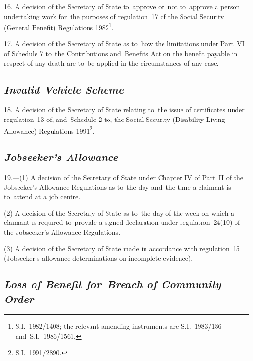 \documentclass[12pt,a4paper]{article}
\begin{document}
\medskip

16.  A decision of the Secretary of State to~approve or~not to~approve a person undertaking work for~the purposes of regulation~17 of the Social Security (General Benefit) Regulations 1982\footnote{\frenchspacing S.I.~1982/1408; the relevant amending instruments are S.I.~1983/186 and~S.I.~1986/1561.}.

\medskip

17.  A decision of the Secretary of State as to~how the limitations under Part~VI of Schedule 7 to~the Contributions and~Benefits Act on the benefit payable in respect of any death are to~be applied in the circumstances of any case.

\subsection*{\itshape Invalid Vehicle Scheme}

18.  A decision of the Secretary of State relating to~the issue of certificates under regulation~13 of, and~Schedule 2 to, the Social Security (Disability Living Allowance) Regulations 1991\footnote{\frenchspacing S.I.~1991/2890.}.

\subsection*{\itshape Jobseeker’s Allowance}

19.—(1) A decision of the Secretary of State under Chapter IV of Part~II of the Jobseeker’s Allowance Regulations as to~the day and~the time a claimant is to~attend at a job centre.

(2) A decision of the Secretary of State as to~the day of the week on which a claimant is required to~provide a signed declaration under regulation~24(10) of the Jobseeker’s Allowance Regulations.

(3) A decision of the Secretary of State 
made in accordance with regulation~15 (Jobseeker’s allowance determinations on incomplete evidence).


\subsection*{\itshape Loss of Benefit for~Breach of Community Order}
\end{document}
